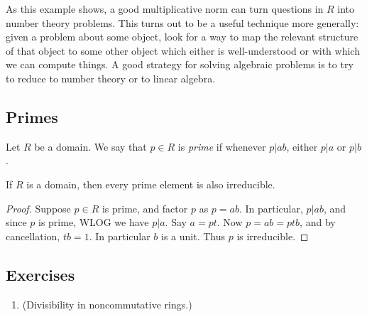 \documentclass{article}
\begin{document}
As this example shows, a good multiplicative norm can turn questions in $R$ into number theory problems. This turns out to be a useful technique more generally: given a problem about some object, look for a way to map the relevant structure of that object to some other object which either is well-understood or with which we can compute things. A good strategy for solving algebraic problems is to try to reduce to number theory or to linear algebra.

\subsection*{Primes}

\begin{dfn}
Let $R$ be a domain. We say that $p \in R$ is \emph{prime} if whenever $p|ab$, either $p|a$ or $p|b$.
\end{dfn}

\begin{prop}
If $R$ is a domain, then every prime element is also irreducible.
\end{prop}

\begin{proof}
Suppose $p \in R$ is prime, and factor $p$ as $p = ab$. In particular, $p|ab$, and since $p$ is prime, WLOG we have $p|a$. Say $a = pt$. Now $p = ab = ptb$, and by cancellation, $tb = 1$. In particular $b$ is a unit. Thus $p$ is irreducible.
\end{proof}

\subsection*{Exercises}

\begin{enumerate}
\item (Divisibility in noncommutative rings.)
\end{enumerate}
\end{document}
